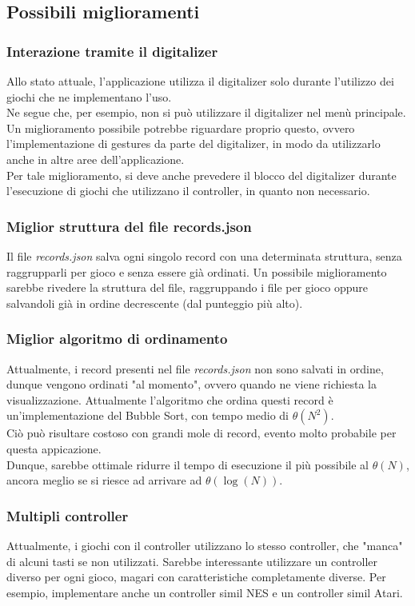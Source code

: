 \subsection{Possibili miglioramenti}
\subsubsection{Interazione tramite il digitalizer}
Allo stato attuale, l'applicazione utilizza il digitalizer solo durante l'utilizzo dei giochi che ne implementano l'uso.\\ Ne segue che, per esempio, non si può utilizzare il digitalizer nel menù principale.\\
Un miglioramento possibile potrebbe riguardare proprio questo, ovvero l'implementazione di gestures da parte del digitalizer, in modo da utilizzarlo anche in altre aree dell'applicazione.\\
Per tale miglioramento, si deve anche prevedere il blocco del digitalizer durante l'esecuzione di giochi che utilizzano il controller, in quanto non necessario.
\subsubsection{Miglior struttura del file records.json}
Il file \textit{records.json} salva ogni singolo record con una determinata struttura, senza raggrupparli per gioco e senza essere già ordinati. Un possibile miglioramento sarebbe rivedere la struttura del file, raggruppando i file per gioco oppure salvandoli già in ordine decrescente (dal punteggio più alto).
\subsubsection{Miglior algoritmo di ordinamento}
Attualmente, i record presenti nel file \textit{records.json} non sono salvati in ordine, dunque vengono ordinati "al momento", ovvero quando ne viene richiesta la visualizzazione. Attualmente l'algoritmo che ordina questi record è un'implementazione del Bubble Sort, con tempo medio di $\theta(N^2)$.\\ Ciò può risultare costoso con grandi mole di record, evento molto probabile per questa appicazione.\\
Dunque, sarebbe ottimale ridurre il tempo di esecuzione il più possibile al $\theta(N)$, ancora meglio se si riesce ad arrivare ad $\theta(\log(N))$.
\subsubsection{Multipli controller}
Attualmente, i giochi con il controller utilizzano lo stesso controller, che "manca" di alcuni tasti se non utilizzati. Sarebbe interessante utilizzare un controller diverso per ogni gioco, magari con caratteristiche completamente diverse. Per esempio, implementare anche un controller simil NES e un controller simil Atari.

